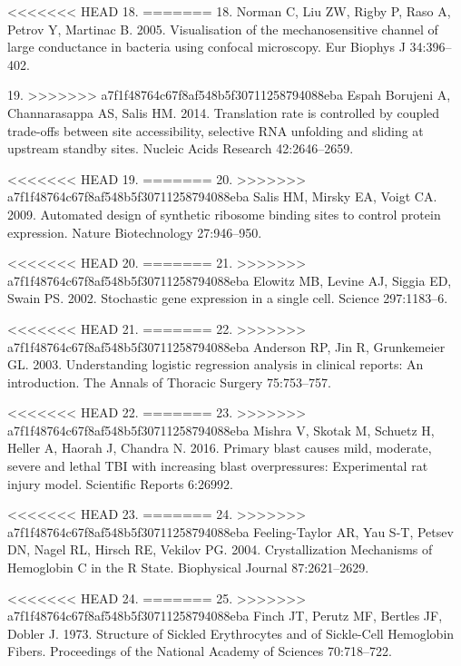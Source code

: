 <<<<<<< HEAD
\hypertarget{ref-espahborujeni2014}{}
18.
=======
\hypertarget{ref-norman2005}{}
18.
Norman
C, Liu
ZW,
Rigby
P,
Raso
A,
Petrov
Y,
Martinac
B.
2005.
Visualisation
of the
mechanosensitive
channel
of
large
conductance
in
bacteria
using
confocal
microscopy.
Eur
Biophys
J
34:396--402.

\hypertarget{ref-espahborujeni2014}{}
19.
>>>>>>> a7f1f48764c67f8af548b5f30711258794088eba
Espah
Borujeni
A,
Channarasappa
AS,
Salis
HM.
2014.
Translation
rate
is
controlled
by
coupled
trade-offs
between
site
accessibility,
selective
RNA
unfolding
and
sliding
at
upstream
standby
sites.
Nucleic
Acids
Research
42:2646--2659.

\hypertarget{ref-salis2009}{}
<<<<<<< HEAD
19.
=======
20.
>>>>>>> a7f1f48764c67f8af548b5f30711258794088eba
Salis
HM,
Mirsky
EA,
Voigt
CA.
2009.
Automated
design
of
synthetic
ribosome
binding
sites
to
control
protein
expression.
Nature
Biotechnology
27:946--950.

\hypertarget{ref-elowitz2002}{}
<<<<<<< HEAD
20.
=======
21.
>>>>>>> a7f1f48764c67f8af548b5f30711258794088eba
Elowitz
MB,
Levine
AJ,
Siggia
ED,
Swain
PS.
2002.
Stochastic
gene
expression
in a
single
cell.
Science
297:1183--6.

\hypertarget{ref-anderson2003}{}
<<<<<<< HEAD
21.
=======
22.
>>>>>>> a7f1f48764c67f8af548b5f30711258794088eba
Anderson
RP,
Jin R,
Grunkemeier
GL.
2003.
Understanding
logistic
regression
analysis
in
clinical
reports:
An
introduction.
The
Annals
of
Thoracic
Surgery
75:753--757.

\hypertarget{ref-mishra2016}{}
<<<<<<< HEAD
22.
=======
23.
>>>>>>> a7f1f48764c67f8af548b5f30711258794088eba
Mishra
V,
Skotak
M,
Schuetz
H,
Heller
A,
Haorah
J,
Chandra
N.
2016.
Primary
blast
causes
mild,
moderate,
severe
and
lethal
TBI
with
increasing
blast
overpressures:
Experimental
rat
injury
model.
Scientific
Reports
6:26992.

\hypertarget{ref-feeling-taylor2004}{}
<<<<<<< HEAD
23.
=======
24.
>>>>>>> a7f1f48764c67f8af548b5f30711258794088eba
Feeling-Taylor
AR,
Yau
S-T,
Petsev
DN,
Nagel
RL,
Hirsch
RE,
Vekilov
PG.
2004.
Crystallization
Mechanisms
of
Hemoglobin
C in
the R
State.
Biophysical
Journal
87:2621--2629.

\hypertarget{ref-finch1973}{}
<<<<<<< HEAD
24.
=======
25.
>>>>>>> a7f1f48764c67f8af548b5f30711258794088eba
Finch
JT,
Perutz
MF,
Bertles
JF,
Dobler
J.
1973.
Structure
of
Sickled
Erythrocytes
and of
Sickle-Cell
Hemoglobin
Fibers.
Proceedings
of the
National
Academy
of
Sciences
70:718--722.

